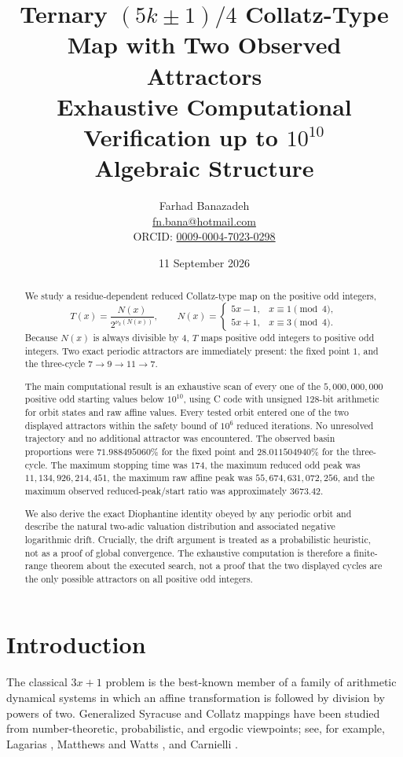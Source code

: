 \documentclass[11pt]{article}
\title{\textbf{Ternary \((5k\pm1)/4\) Collatz-Type Map with Two Observed Attractors}\\
\large Exhaustive Computational Verification up to \(10^{10}\)\\
\large Algebraic Structure}
\author{Farhad Banazadeh\\
\normalsize \href{mailto:fn.bana@hotmail.com}{fn.bana@hotmail.com}\\
\normalsize ORCID: \href{https://orcid.org/0009-0004-7023-0298}{0009-0004-7023-0298}}
\date{11 September 2026}
\newcommand{\vTwo}{\nu_2}
\begin{document}
\maketitle

\begin{abstract}
We study a residue-dependent reduced Collatz-type map on the positive odd integers,
\[
T(x)=\frac{N(x)}{2^{\vTwo(N(x))}},\qquad
N(x)=
\begin{cases}
5x-1,&x\equiv1\pmod4,\\
5x+1,&x\equiv3\pmod4.
\end{cases}
\]
Because \(N(x)\) is always divisible by \(4\), \(T\) maps positive odd integers to positive odd integers. Two exact periodic attractors are immediately present: the fixed point \(1\), and the three-cycle \(7\to9\to11\to7\).

The main computational result is an exhaustive scan of every one of the \(5{,}000{,}000{,}000\) positive odd starting values below \(10^{10}\), using C code with unsigned 128-bit arithmetic for orbit states and raw affine values. Every tested orbit entered one of the two displayed attractors within the safety bound of \(10^6\) reduced iterations. No unresolved trajectory and no additional attractor was encountered. The observed basin proportions were \(71.988495060\%\) for the fixed point and \(28.011504940\%\) for the three-cycle. The maximum stopping time was \(174\), the maximum reduced odd peak was \(11{,}134{,}926{,}214{,}451\), the maximum raw affine peak was \(55{,}674{,}631{,}072{,}256\), and the maximum observed reduced-peak/start ratio was approximately \(3673.42\).

We also derive the exact Diophantine identity obeyed by any periodic orbit and describe the natural two-adic valuation distribution and associated negative logarithmic drift. Crucially, the drift argument is treated as a probabilistic heuristic, not as a proof of global convergence. The exhaustive computation is therefore a finite-range theorem about the executed search, not a proof that the two displayed cycles are the only possible attractors on all positive odd integers.
\end{abstract}

\section{Introduction}

The classical \(3x+1\) problem is the best-known member of a family of arithmetic dynamical systems in which an affine transformation is followed by division by powers of two. Generalized Syracuse and Collatz mappings have been studied from number-theoretic, probabilistic, and ergodic viewpoints; see, for example, Lagarias \cite{Lagarias1985}, Matthews and Watts \cite{MatthewsWatts1985}, and Carnielli \cite{Carnielli2015}.
\end{document}
